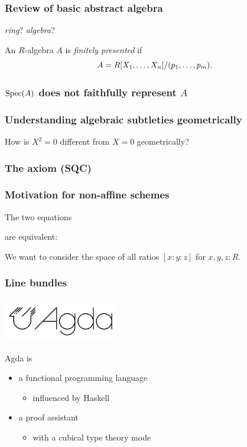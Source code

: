 \documentclass[aspectratio=1610]{beamer}
\begin{document}
\begin{frame}
  \frametitle{Review of basic abstract algebra}

  \emph{ring}?
  \emph{algebra}?

  An $R$-algebra $A$ is \emph{finitely presented} if
  \[ A = R[X_1, \dots, X_n]/(p_1, \dots, p_m) \rlap{.}\]
\end{frame}

\begin{frame}
  \frametitle{$\operatorname{Spec}(A)$ does not faithfully represent $A$}
\end{frame}

\begin{frame}
  \frametitle{Understanding algebraic subtleties geometrically}

  How is $X^2 = 0$ different from $X = 0$ geometrically?
\end{frame}

\begin{frame}
  \frametitle{The axiom (SQC)}
\end{frame}

\begin{frame}
  \frametitle{Motivation for non-affine schemes}

  \begin{example}
    The two equations

    are equivalent:
  \end{example}

  We want to consider the space of all \alert{ratios} $[x : y : z]$
  for $x, y, z : R$.
\end{frame}

\begin{frame}
  \frametitle{Line bundles}
\end{frame}

\begin{frame}
  \frametitle{\includegraphics[width=5cm]{./images/agda-logo.png}}

  Agda is
  \begin{itemize}
    \item
      a functional programming language
      \begin{itemize}
        \item
          influenced by Haskell
      \end{itemize}
    \item
      a proof assistant
      \begin{itemize}
        \item
          with a \alert{cubical type theory} mode
      \end{itemize}
  \end{itemize}
\end{frame}
\end{document}
